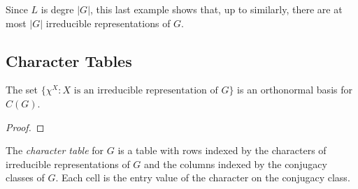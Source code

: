 \begin{remark}
	Since $L$ is degre $|G|$, this last example shows that, up to similarly, there are at most $|G|$ irreducible representations of $G$. 
\end{remark}

\subsection{Character Tables}

\begin{theorem}
	The set $\{\chi^X : X \text{ is an irreducible representation of $G$}\}$ is an orthonormal basis for $C(G)$.
\end{theorem}
	{\color{red}
	\begin{proof}
			
	\end{proof}}

\begin{definition}
	The \emph{character table} for $G$ is a table with rows indexed by the characters of irreducible representations of $G$ and the columns indexed by the conjugacy classes of $G$. Each cell is the entry value of the character on the conjugacy class.
\end{definition}

